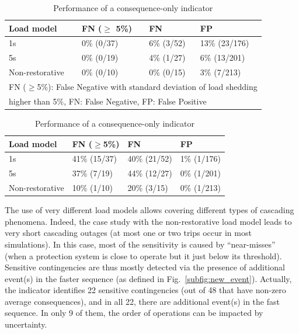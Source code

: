 

\begin{table}
\centering
\caption{Performance of the proposed indicator}
\label{tab:indicator}
\vspace{-0.3cm}
\begin{tabular}{@{}llll@{}}
\toprule
Load model      & FN (\(\ge\) 5\%) & FN     & FP            \\ \midrule
1s              & 0\% (0/37)  & 6\% (3/52)  & 13\% (23/176) \\
5s              & 0\% (0/19)  & 4\% (1/27)  & 6\% (13/201)  \\
Non-restorative & 0\% (0/10)  & 0\% (0/15)  & 3\% (7/213)   \\ \bottomrule
\multicolumn{4}{l}{\footnotesize FN (\(\ge\)5\%): False Negative with standard deviation of load shedding} \\
\multicolumn{4}{l}{\footnotesize higher than 5\%, FN: False Negative, FP: False Positive}                \\
\end{tabular}
\bigskip
\centering
\caption{Performance of a consequence-only indicator}
\label{tab:indicator-consequence-based}
\begin{tabular}{@{}llll@{}}
\toprule
Load model & FN (\(\ge\)5\%)  & FN & FP        \\ \midrule
1s              & 41\% (15/37) & 40\% (21/52) & 1\% (1/176) \\
5s              & 37\% (7/19)  & 44\% (12/27) & 0\% (1/201) \\
Non-restorative & 10\% (1/10)  & 20\% (3/15)  & 0\% (1/213) \\ \bottomrule
\end{tabular}
\end{table}

The use of very different load models allows covering different types of cascading phenomena. Indeed, the case study with the non-restorative load model leads to very short cascading outages (at most one or two trips occur in most simulations). In this case, most of the sensitivity is caused by ``near-misses'' (when a protection system is close to operate but it just below its threshold). Sensitive contingencies are thus mostly detected via the presence of additional event(s) in the faster sequence (as defined in Fig.~\ref{subfig:new_event}). Actually, the indicator identifies 22 sensitive contingencies (out of 48 that have non-zero average consequences), and in all 22, there are additional event(s) in the fast sequence. In only 9 of them, the order of operations can be impacted by uncertainty.

